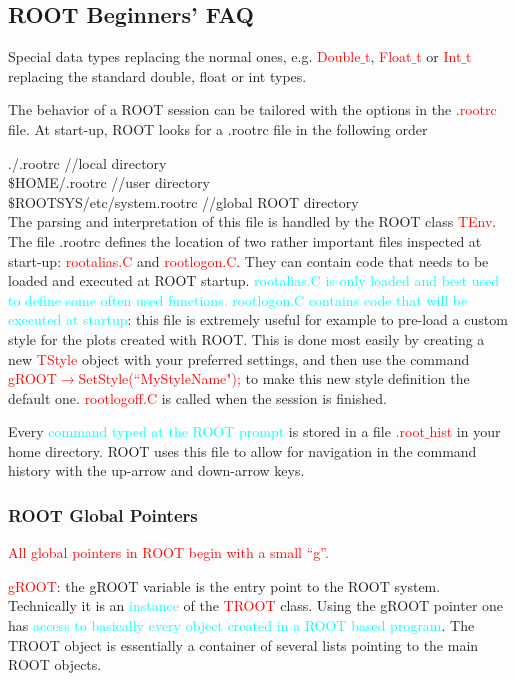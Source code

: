 \documentclass[12pt,a4paper]{article}
\begin{document}
\subsection{ROOT Beginners’ FAQ}
Special data types replacing the normal ones, e.g. \textcolor{red}{Double$\_$t}, \textcolor{red}{Float$\_$t} or \textcolor{red}{Int$\_$t} replacing the standard double, float or int types.

The behavior of a ROOT session can be tailored with the options in the \textcolor{red}{.rootrc} file. At start-up, ROOT looks for a .rootrc file in the following order

./.rootrc //local directory \\
$\$$HOME/.rootrc //user directory \\
$\$$ROOTSYS/etc/system.rootrc //global ROOT directory \\

The parsing and interpretation of this file is handled by the ROOT class \textcolor{red}{TEnv}. The file .rootrc defines the location of two rather important files inspected at start-up: \textcolor{red}{rootalias.C} and \textcolor{red}{rootlogon.C}. They can contain code that needs to be loaded and executed at ROOT startup. \textcolor{cyan}{rootalias.C is only loaded and best used to define some often used functions. rootlogon.C contains code that will be executed at startup}: this file is extremely useful for example to pre-load a custom style for the plots created with ROOT. This is done most easily by creating a new \textcolor{red}{TStyle} object with your preferred settings, and then use the command \textcolor{red}{gROOT$\rightarrow$SetStyle(``MyStyleName");} to make this new style definition the default one. \textcolor{red}{rootlogoff.C} is called when the session is finished.

Every \textcolor{cyan}{command typed at the ROOT prompt} is stored in a file \textcolor{red}{.root$\_$hist} in your home directory. ROOT uses this file to allow for navigation in the command history with the up-arrow and down-arrow keys.

\subsubsection{ROOT Global Pointers}
\textcolor{red}{All global pointers in ROOT begin with a small “g”.}

\textcolor{red}{gROOT}: the gROOT variable is the entry point to the ROOT system. Technically it is an \textcolor{cyan}{instance} of the \textcolor{red}{TROOT} class. Using the gROOT pointer one has \textcolor{cyan}{access to basically every object created in a ROOT based program}. The TROOT object is essentially a container of several lists pointing to the main ROOT objects.
\end{document}
